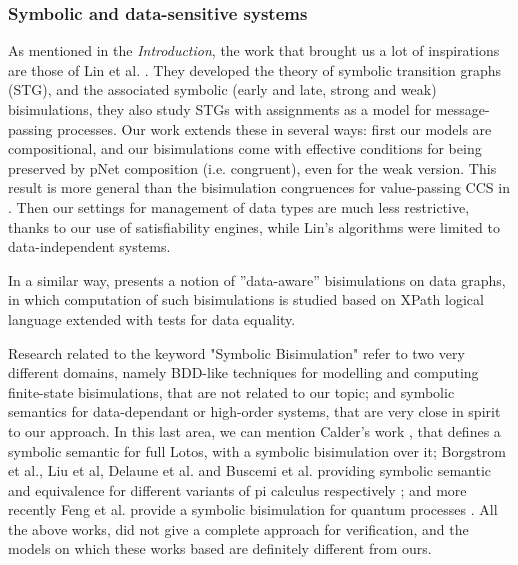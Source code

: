 \documentclass{elsarticle}
\begin{document}
\subsubsection*{Symbolic and data-sensitive systems}
 As mentioned in the \emph{Introduction}, the work that brought us a lot of inspirations are those of Lin et al. \cite{IngolfsdottirL:2001,HennessyLin:TCS95,Linconcur96}. They developed the theory of symbolic transition graphs (STG), and the associated symbolic (early and late, strong and weak) bisimulations, they also study STGs with assignments as a model for message-passing processes. Our work extends these in several ways: first our models are compositional, and our bisimulations come with effective conditions for being preserved by pNet composition (i.e. congruent), even for the weak version. This result is more general than the bisimulation congruences for value-passing CCS in \cite{IngolfsdottirL:2001}. Then our settings for management of data types are much less restrictive, thanks to our use of satisfiability engines, while Lin's algorithms were limited to data-independent systems. 

In a similar way, \cite{Abriola:2018} presents a notion of ''data-aware'' bisimulations on data graphs, in which computation of such bisimulations is studied based on XPath logical language extended with tests for data equality.


Research related to the keyword "Symbolic Bisimulation" refer to two very different domains, namely BDD-like techniques for modelling and computing finite-state bisimulations, that are not related to our topic; and symbolic semantics for data-dependant or high-order systems, that are very close in spirit to our approach. In this last area, we can mention
Calder's work \cite{calder2001symbolic}, that  defines a symbolic semantic for full Lotos, with a symbolic bisimulation over it;
Borgstrom et al., Liu et al, Delaune et al. and Buscemi et al. providing symbolic semantic and equivalence for different variants of pi calculus respectively \cite{borgstrom2004symbolic,delaune2007symbolic,liu2010complete,buscemi2008open}; and more recently
 Feng et al. provide a symbolic bisimulation for quantum processes \cite{feng2014symbolic}.
All the above works, did not give a complete approach for verification, and the models on which these works based are definitely different from ours.
\end{document}
